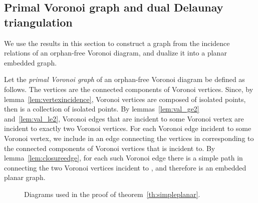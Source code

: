 \documentclass[11pt]{article}
\begin{document}
\subsection{Primal Voronoi graph and dual Delaunay triangulation}\label{primaldual}

We use the results in this section to construct a graph from the 
	incidence relations of an orphan-free Voronoi diagram, 
	and dualize it into a planar embedded graph. 

Let the \emph{primal Voronoi graph} 
	of an orphan-free Voronoi diagram be defined as follows. 
The vertices  are the connected components of Voronoi vertices. 
Since, by lemma~\ref{lem:vertexincidence}, 
	Voronoi vertices are composed of isolated points, then  is a collection of isolated points. 
By lemmas~\ref{lem:val_ge2} and~\ref{lem:val_le2}, 
	Voronoi edges that are incident to some Voronoi vertex are incident to exactly two Voronoi vertices. 
For each Voronoi edge  incident to some Voronoi vertex, 
	we include in  an edge connecting the vertices in  
	corresponding to the connected components of Voronoi vertices that  is incident to. 
By lemma~\ref{lem:closureedge}, for each such Voronoi edge  there is a simple path in 
	connecting the two Voronoi vertices incident to , and therefore  is an embedded planar graph. 



\begin{figure}[htbp]
   \centering
	\quad\quad
   \caption{Diagrams used in the proof of theorem~\ref{th:simpleplanar}. }
\end{figure}
\end{document}
